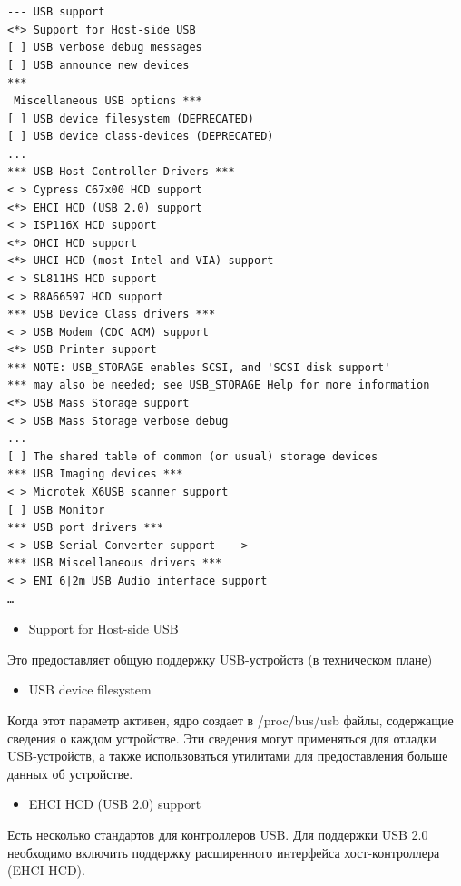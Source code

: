 \documentclass[10pt]{book}
\begin{document}
\vspace{3mm}
\begin{tcolorbox}
\begin{lstlisting}
--- USB support
<*> Support for Host-side USB
[ ] USB verbose debug messages
[ ] USB announce new devices
***
 Miscellaneous USB options ***
[ ] USB device filesystem (DEPRECATED)
[ ] USB device class-devices (DEPRECATED)
...
*** USB Host Controller Drivers ***
< > Cypress C67x00 HCD support
<*> EHCI HCD (USB 2.0) support
< > ISP116X HCD support
<*> OHCI HCD support
<*> UHCI HCD (most Intel and VIA) support
< > SL811HS HCD support
< > R8A66597 HCD support
*** USB Device Class drivers ***
< > USB Modem (CDC ACM) support
<*> USB Printer support
*** NOTE: USB_STORAGE enables SCSI, and 'SCSI disk support'
*** may also be needed; see USB_STORAGE Help for more information
<*> USB Mass Storage support
< > USB Mass Storage verbose debug
...
[ ] The shared table of common (or usual) storage devices
*** USB Imaging devices ***
< > Microtek X6USB scanner support
[ ] USB Monitor
*** USB port drivers ***
< > USB Serial Converter support --->
*** USB Miscellaneous drivers ***
< > EMI 6|2m USB Audio interface support
…
\end{lstlisting}
\end{tcolorbox}

\begin{itemize}
\item Support for Host-side USB
\end{itemize}

Это предоставляет общую поддержку USB-устройств (в техническом плане)

\begin{itemize}
\item  USB device filesystem
\end{itemize}

Когда этот параметр активен, ядро создает в /proc/bus/usb файлы, содержащие сведения о каждом устройстве. Эти сведения могут применяться для отладки USB-устройств, а также использоваться утилитами для предоставления больше данных об устройстве. 

\begin{itemize}
\item EHCI HCD (USB 2.0) support
\end{itemize}

Есть несколько стандартов для контроллеров USB. Для поддержки USB 2.0  необходимо включить поддержку расширенного интерфейса хост-контроллера (EHCI HCD).
\end{document}
